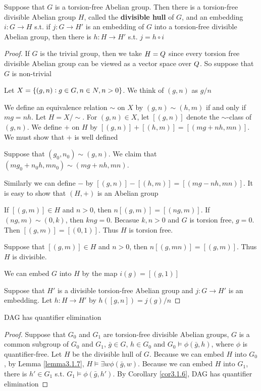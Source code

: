 \documentclass[11pt]{article}
\begin{document}
\begin{lemma}[]
\label{lemma3.1.8}
Suppose that \(G\) is a torsion-free Abelian group. Then there is a
torsion-free divisible Abelian group \(H\), called the \textbf{divisible hull} of
\(G\), and an embedding \(i:G\to H\) s.t. if \(j:G\to H'\) is an embedding of
\(G\) into a torsion-free divisible Abelian group, then there is \(h:H\to H'\) s.t.
\(j=h\circ i\)
\end{lemma}

\begin{proof}
If \(G\) is the trivial group, then we take \(H=\relax{Q}\) since every torsion
free divisible Abelian group can be viewed as a vector space over \(\relax{Q}\). So
suppose that \(G\) is non-trivial

Let \(X=\{(g,n):g\in G,n\in\relax{N},n>0\}\). We think of \((g,n)\) as \(g/n\)

We define an equivalence relation \(\sim\) on \(X\) by \((g,n)\sim(h,m)\) if and
only if \(mg=nh\). Let \(H=X/\sim\). For \((g,n)\in X\), let \([(g,n)]\) denote
the \(\sim\)-class of \((g,n)\). We define \(+\) on \(H\) by
\([(g,n)]+[(h,m)]=[(mg+nh,mn)]\). We must show that \(+\) is well defined

Suppose that \((g_0,n_0)\sim(g,n)\). We claim that
\((mg_0+n_0h,mn_0)\sim(mg+nh,mn)\).

Similarly we can define \(-\) by \([(g,n)]-[(h,m)]=[(mg-nh,mn)]\). It is
easy to show that \((H,+)\) is an Abelian group

If \([(g,m)]\in H\) and \(n>0\), then \(n[(g,m)]=[(ng,m)]\). If
\((ng,m)\sim(0,k)\), then \(kng=0\). Becasue \(k,n>0\) and \(G\) is torsion
free, \(g=0\). Then \([(g,m)]=[(0,1)]\). Thus \(H\) is torsion free.

Suppose that \([(g,m)]\in H\) and \(n>0\), then \(n[(g,mn)]=[(g,m)]\). Thus
\(H\) is divisible.

We can embed \(G\) into \(H\) by the map \(i(g)=[(g,1)]\)

Suppose that \(H'\) is a divisible torsion-free Abelian group and
\(j:G\to H'\) is an embedding. Let \(h:H\to H'\) by \(h([g,n])=j(g)/n\)
\end{proof}

\begin{theorem}[]
\label{thm3.1.9}
DAG has quantifier elimination
\end{theorem}
\begin{proof}
Suppose that \(G_0\) and \(G_1\) are torsion-free divisible Abelian groups,
\(G\) is a common subgroup of \(G_0\) and \(G_1\), \(\bar{g}\in G\),
\(h\in G_0\) and \(G_0\models\phi(\bar{g},h)\), where \(\phi\) is quantifier-free.
Let \(H\) be the divisible hull of \(G\). Because we can embed \(H\) into
\(G_0\), by Lemma \ref{lemma3.1.7}, \(H\models\exists w\phi(\bar{g},w)\). Because
we can embed \(H\) into \(G_1\), there is \(h'\in G_1\) s.t.
\(G_1\models\phi(\bar{g},h')\). By Corollary \ref{cor3.1.6}, DAG has
quantifier elimination
\end{proof}
\end{document}
